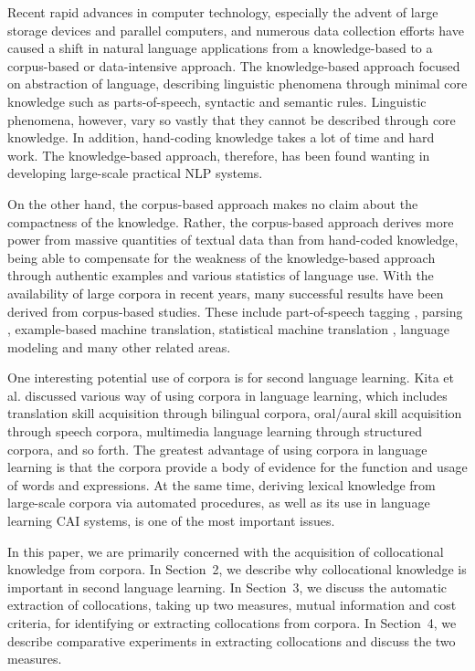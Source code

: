 Recent rapid advances in computer technology,
especially the advent of large storage devices and parallel computers,
and numerous data collection efforts
have caused a shift in natural language applications
from a knowledge-based to a corpus-based or data-intensive approach.
The knowledge-based approach focused on abstraction of language,
describing linguistic phenomena through minimal core knowledge
such as parts-of-speech, syntactic and semantic rules.
Linguistic phenomena, however, vary so vastly that
they cannot be described through core knowledge.
In addition, hand-coding knowledge takes a lot of time and hard work.
The knowledge-based approach, therefore, has been found wanting
in developing large-scale practical NLP systems.

On the other hand,
the corpus-based approach makes no claim about the compactness
of the knowledge.
Rather, the corpus-based approach derives more power
from massive quantities of textual data than from hand-coded knowledge,
being able to compensate for the weakness of the knowledge-based approach
through authentic examples and various statistics of language use.
With the availability of large corpora in recent years,
many successful results have been derived from corpus-based studies.
These include part-of-speech tagging \cite{Kupiec92},
parsing \cite{Magerman90},
example-based machine translation\cite{Sumita92},
statistical machine translation \cite{Brown90,Brown93},
language modeling \cite{Jelinek90,Kita92}
and many other related areas.

One interesting potential use of corpora
is for second language learning.
Kita et al. \cite{Kita93b} discussed various way of using corpora
in language learning,
which includes translation skill acquisition through bilingual corpora,
oral/aural skill acquisition through speech corpora,
multimedia language learning through structured corpora, and so forth.
The greatest advantage of using corpora in language learning is that
the corpora provide a body of evidence for the function and usage of words
and expressions.
At the same time,
deriving lexical knowledge
from large-scale corpora via automated procedures,
as well as its use in language learning CAI systems,
is one of the most important issues.

In this paper, we are primarily concerned with the acquisition
of collocational knowledge from corpora.
In Section~2, we describe why collocational knowledge is
important in second language learning.
In Section~3, we discuss the automatic extraction of collocations,
taking up two measures, mutual information and cost criteria,
for identifying or extracting collocations from corpora.
In Section~4, we describe comparative experiments in extracting collocations
and discuss the two measures.


